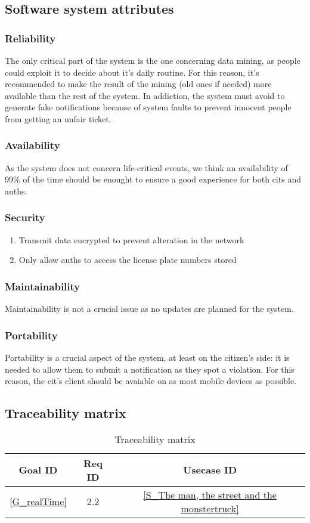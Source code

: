 \documentclass{article}
\begin{document}
	\subsection{Software system attributes}
		\subsubsection{Reliability}
			The only critical part of the system is the one concerning data mining, as people could exploit it to decide about it's daily routine. For this reason, it's recommended to make the result of the mining (old ones if needed) more available than the rest of the system.
			In addiction, the system must avoid to generate fake notifications because of system faults to prevent innocent people from getting an unfair ticket.
		\subsubsection{Availability}
			As the system does not concern life-critical events, we think an availability of 99\% of the time should be enought to ensure a good experience for both cits and auths.
		\subsubsection{Security}
			\begin{enumerate}
				\item Transmit data encrypted to prevent alteration in the network
				\item Only allow auths to access the license plate numbers stored
			\end{enumerate}
		\subsubsection{Maintainability}
			Maintainability is not a crucial issue as no updates are planned for the system.
		\subsubsection{Portability}
			Portability is a crucial aspect of the system, at least on the citizen's side: it is needed to allow them to submit a notification as they spot a violation. For this reason, the cit's client should be avaiable on as most mobile devices as possible.
	\subsection{Traceability matrix}
		\begin{table}[h]
			\begin{center}
				\caption{Traceability matrix}
				\label{Trace matrix}
				\begin{tabular}{S|S|S}
					\textbf{Goal ID} & \textbf{Req ID} & \textbf{Usecase ID}\\
					\hline
					\ref{G_realTime} & 2.2 & \ref{S_The man, the street and the monstertruck}
				\end{tabular}
			\end{center}
		\end{table}
\end{document}
